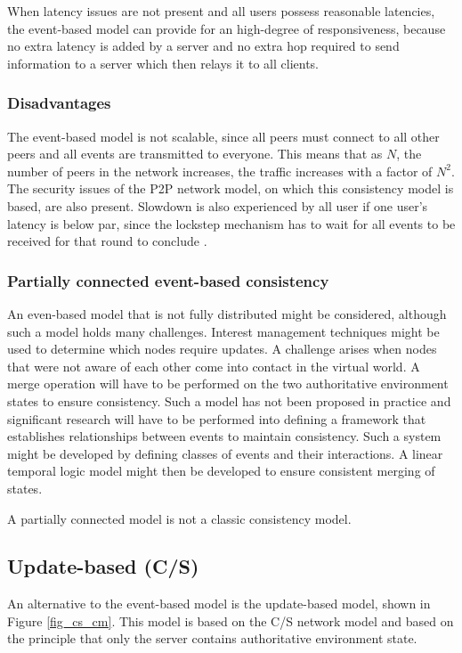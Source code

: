 When latency issues are not present and all users possess reasonable latencies, the event-based model can provide for an high-degree of responsiveness, because no extra latency is added by a server and no extra hop required to send information to a server which then relays it to all clients.

\subsubsection{Disadvantages}
The event-based model is not scalable, since all peers must connect to all other peers and all events are transmitted to
everyone. This means that as $N$, the number of peers in the network increases, the traffic increases with a factor of $N^2$. The security issues of
the P2P network model, on which this consistency model is based, are also present. Slowdown is also experienced by all user if one user's
latency is below par, since the lockstep mechanism has to wait for all events to be received for that round to conclude \cite{cheat_proof_event_ordering}.

\subsubsection{Partially connected event-based consistency}
An even-based model that is not fully distributed might be considered, although such a model holds many challenges. Interest management techniques might be used to determine which nodes require updates. A challenge arises when nodes that were not aware of each other come into contact in the virtual world. A merge operation will have to be performed on the two authoritative environment states to ensure consistency. Such a model has not been proposed in practice and significant research will have to be performed into defining a framework that establishes relationships between events to maintain consistency. Such a system might be developed by defining classes of events and their interactions. A linear temporal logic model might then be developed to ensure consistent merging of states.

A partially connected model is not a classic consistency model.

\subsection{Update-based (C/S)}
\label{classic_update_based}

An alternative to the event-based model is the update-based model, shown in Figure \ref{fig_cs_cm}. This model is based on the C/S network model and based on the principle that only the server contains authoritative environment state.

